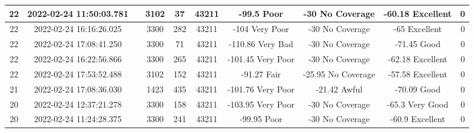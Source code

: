 \begin{longtable*}{|c|c|c|c|c|c|c|c|c|c|}
22&2022-02-24 11:50:03.781&&3102&37&43211& -99.5     Poor        & -30       No Coverage & -60.18    Excellent   & 0\\\hline
{}22&2022-02-24 16:16:26.025&&3300&282&43211& -104      Very Poor   & -30       No Coverage & -65       Excellent   & 0\\\hline
{}22&2022-02-24 17:08:41.250&&3300&71&43211& -110.86   Very Bad    & -30       No Coverage & -71.45    Good        & 0\\\hline
{}22&2022-02-24 16:22:56.866&&3300&265&43211& -101.45   Very Poor   & -30       No Coverage & -62.18    Excellent   & 0\\\hline
{}22&2022-02-24 17:53:52.488&&3102&152&43211& -91.27    Fair        & -25.95    No Coverage & -57.58    Excellent   & 0\\\hline
{}21&2022-02-24 17:08:36.030&&1423&435&43211& -101.76   Very Poor   & -21.42    Awful       & -70.09    Good        & 0\\\hline
{}20&2022-02-24 12:37:21.278&&3300&158&43211& -103.95   Very Poor   & -30       No Coverage & -65.3     Very Good   & 0\\\hline
{}20&2022-02-24 11:24:28.375&&3300&241&43211& -99.95    Poor        & -30       No Coverage & -60.9     Excellent   & 0\\\hline

\end{longtable*}
